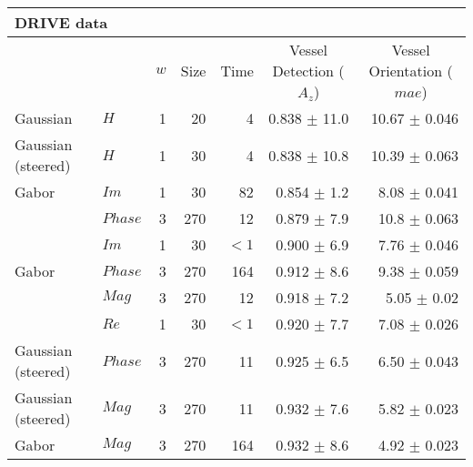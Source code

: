 \begin{tabularx}{\linewidth}{p{3cm} p{3cm} r r r r r}
\toprule
\multicolumn{7}{l}{DRIVE data} \\
\midrule
            &
            & $w$
            & Size
            & Time
            & \multicolumn{1}{c}{Vessel Detection \linebreak ($A_z$)}
            & \multicolumn{1}{c}{Vessel Orientation \linebreak ($mae$)}  \\

Gaussian& $H$                       & 1 &     20    &  4     & 0.838 $\pm$ 11.0& 10.67 $\pm$ 0.046  \\

Gaussian (steered)& $H$             & 1 &     30    &  4     & 0.838 $\pm$ 10.8   & 10.39 $\pm$ 0.063\\

Gabor   & $Im$                      & 1 &     30    & 82     & 0.854 $\pm$ 1.2   & 8.08 $\pm$ 0.041  \\

\dtcwt{}& $Phase$                   & 3 &    270    & 12     & 0.879 $\pm$ 7.9     & 10.8 $\pm$  0.063 \\

\dtcwt{}& $Im$                      & 1 &     30    &${<}1$  & 0.900 $\pm$ 6.9   &  7.76 $\pm$ 0.046 \\

Gabor   & $Phase$                   & 3 &    270    &164     & 0.912 $\pm$ 8.6     & 9.38 $\pm$  0.059 \\

\dtcwt{}& $Mag$                     & 3 &    270    & 12     & 0.918 $\pm$ 7.2     & 5.05 $\pm$  0.02 \\

\dtcwt{}& $Re$                      & 1 &     30    &${<}1$  & 0.920 $\pm$ 7.7   &  7.08 $\pm$ 0.026  \\

Gaussian (steered)& $Phase$         & 3 &    270    & 11     & 0.925 $\pm$ 6.5    & 6.50 $\pm$ 0.043 \\

Gaussian (steered)& $Mag$           & 3 &    270    & 11     & 0.932 $\pm$ 7.6     & 5.82 $\pm$ 0.023 \\

Gabor   & $Mag$                     & 3 &    270    &164     & 0.932 $\pm$ 8.6     & 4.92 $\pm$  0.023 \\


\end{tabularx}

